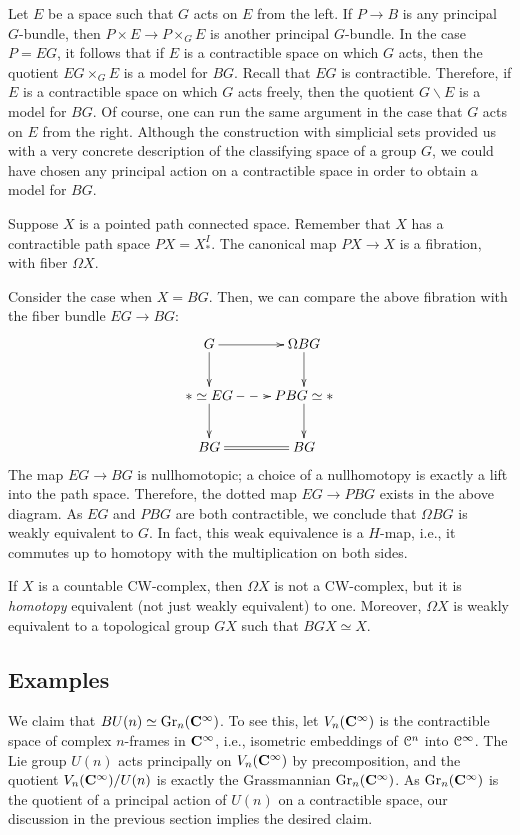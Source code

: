Let $E$ be a space such that $G$ acts on $E$ from the left. If $P\to B$ is any
principal $G$-bundle, then $P\times E\to P\times_G E$ is another principal
$G$-bundle. In the case $P = EG$, it follows that if $E$ is a contractible
space on which $G$ acts, then the quotient $EG\times_G E$ is a model for $BG$.
Recall that $EG$ is contractible. Therefore, if $E$ is a contractible space on
which $G$ acts freely, then the quotient $G\backslash E$ is a model for $BG$.
Of course, one can run the same argument in the case that $G$ acts on $E$ from
the right. Although the construction with simplicial sets provided us with a
very concrete description of the classifying space of a group $G$, we could
have chosen any principal action on a contractible space in order to obtain a
model for $BG$.

Suppose $X$ is a pointed path connected space. Remember that $X$ has a
contractible path space $PX = X^I_\ast$. The canonical map $PX\to X$ is a
fibration, with fiber $\Omega X$.

Consider the case when $X = BG$. Then, we can compare the above fibration with
the fiber bundle $EG\to BG$:
\begin{equation*}
    \xymatrix{
	G\ar[r]\ar[d] & \Omega BG\ar[d]\\
	\ast \simeq EG\ar[d]\ar@{-->}[r] & PBG\simeq \ast \ar[d]\\
	BG\ar@{=}[r] & BG
    }
\end{equation*}
The map $EG\to BG$ is nullhomotopic; a choice of a nullhomotopy is exactly a
lift into the path space. Therefore, the dotted map $EG\to PBG$ exists in the
above diagram. As $EG$ and $PBG$ are both contractible, we conclude that
$\Omega BG$ is weakly equivalent to $G$. In fact, this weak equivalence is a
$H$-map, i.e., it commutes up to homotopy with the multiplication on both
sides.
\begin{remark}[Milnor]
    If $X$ is a countable CW-complex, then $\Omega X$ is not a CW-complex, but
    it is \emph{homotopy} equivalent (not just weakly equivalent) to one.
    Moreover, $\Omega X$ is weakly equivalent to a topological group $GX$ such
    that $BGX\simeq X$.
\end{remark}
\subsection{Examples}
We claim that $BU(n)\simeq \mathrm{Gr}_n(\mathbf C^\infty)$. To see this, let
$V_n(\mathbf C^\infty)$ is the contractible space of complex $n$-frames in
$\mathbf C^\infty$, i.e., isometric embeddings of $\mathcal C^n$ into $\mathcal C^\infty$. The
Lie group $U(n)$ acts principally on $V_n(\mathbf C^\infty)$ by precomposition, and the
quotient $V_n(\mathbf C^\infty)/U(n)$ is exactly the Grassmannian
$\mathrm{Gr}_n(\mathbf C^\infty)$. As $\mathrm{Gr}_n(\mathbf C^\infty)$ is the quotient of a principal action
of $U(n)$ on a contractible space, our discussion in the previous section
implies the desired claim.

